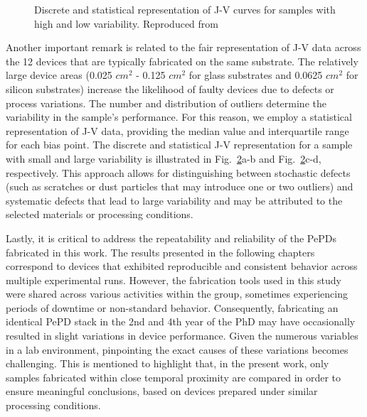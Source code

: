 \begin{figure}[ht!]
\begin{subfigure}[t]{0.4\textwidth}
        \caption{}
        \label{fig:ch2:low_yield_median}
    \end{subfigure}
    \caption{Discrete and statistical representation of J-V curves for samples with high and low variability. Reproduced from \cite{Bowring2018ReverseCells}}
    \label{fig:ch2:discrete_and_median}
\end{figure}


Another important remark is related to the fair representation of J-V data across the 12 devices that are typically fabricated on the same substrate. The relatively large device areas (0.025 $cm^2$ - 0.125 $cm^2$ for glass substrates and 0.0625 $cm^2$ for silicon substrates) increase the likelihood of faulty devices due to defects or process variations. The number and distribution of outliers determine the variability in the sample's performance. For this reason,
we employ a statistical representation of J-V data, providing the median value and interquartile range for each bias point. The discrete and statistical J-V representation for a sample with small and large variability is illustrated in Fig.~\ref{fig:ch2:discrete_and_median}a-b and Fig.~\ref{fig:ch2:discrete_and_median}c-d, respectively. This approach allows for distinguishing between stochastic defects (such as scratches or dust particles that may introduce one or two outliers) and systematic defects that lead to large variability and may be attributed to the selected materials or processing conditions. 


Lastly, it is critical to address the repeatability and reliability of the PePDs fabricated in this work. The results presented in the following chapters correspond to devices that exhibited reproducible and consistent behavior across multiple experimental runs. However, the fabrication tools used in this study were shared across various activities within the group, sometimes experiencing periods of downtime or non-standard behavior. Consequently, fabricating an identical PePD stack in the 2nd and 4th year of the PhD may have occasionally resulted in slight variations in device performance. Given the numerous variables in a lab environment, pinpointing the exact causes of these variations becomes challenging. This is mentioned to highlight that, in the present work, only samples fabricated within close temporal proximity are compared in order to ensure meaningful conclusions, based on devices prepared under similar processing conditions.

 


\cleardoublepage

